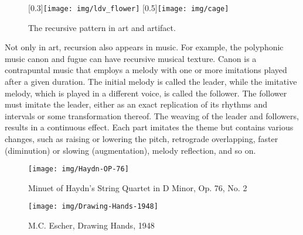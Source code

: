 \documentclass[b5paper]{article}
\begin{document}
\begin{figure}[htbp]
 \centering
 [0.3\linewidth]{\texttt{[image: img/ldv\_flower]}} \quad
 [0.5\linewidth]{\texttt{[image: img/cage]}}
 \caption{The recursive pattern in art and artifact.}
 \label{fig:flower}
\end{figure}

Not only in art, recursion also appears in music. For example, the polyphonic music canon and fugue can have recursive musical texture. Canon is a contrapuntal music that employs a melody with one or more imitations played after a given duration. The initial melody is called the leader, while the imitative melody, which is played in a different voice, is called the follower. The follower must imitate the leader, either as an exact replication of its rhythms and intervals or some transformation thereof. The weaving of the leader and followers, results in a continuous effect. Each part imitates the theme but contains various changes, such as raising or lowering the pitch, retrograde overlapping, faster (diminution) or slowing (augmentation), melody reflection, and so on.

\begin{figure}[htbp]
 \centering
 \texttt{[image: img/Haydn-OP-76]}
 \caption{Minuet of Haydn's String Quartet in D Minor, Op. 76, No. 2}
 \label{fig:Haydn-OP-76}
\end{figure}

\begin{figure}[htbp]
 \centering
 \texttt{[image: img/Drawing-Hands-1948]}
 \caption{M.C. Escher, Drawing Hands, 1948}
 \label{fig:Drawing-Hands}
\end{figure}
\end{document}

